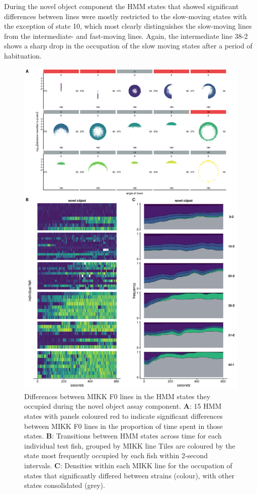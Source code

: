 \documentclass[
]{article}
\begin{document}
During the novel object component the HMM states that showed significant differences between lines were mostly restricted to the slow-moving states with the exception of state 10, which most clearly distinguishes the slow-moving lines from the intermediate- and fast-moving lines. Again, the intermediate line \textcolor{38-2_00C08B}{38-2} shows a sharp drop in the occupation of the slow moving states after a period of habituation.



\begin{figure}
\includegraphics[width=1\linewidth]{figs/mikk_behaviour/select_0.08_15_dge_no} \caption{Differences between MIKK F0 lines in the HMM states they occupied during the novel object assay component. \textbf{A}: 15 HMM states with panels coloured red to indicate significant differences between MIKK F0 lines in the proportion of time spent in those states. \textbf{B}: Transitions between HMM states across time for each individual test fish, grouped by MIKK line Tiles are coloured by the state most frequently occupied by each fish within 2-second intervals. \textbf{C}: Densities within each MIKK line for the occupation of states that significantly differed between strains (colour), with other states consolidated (grey).}\label{fig:F2-time-dge-no}
\end{figure}
\end{document}
